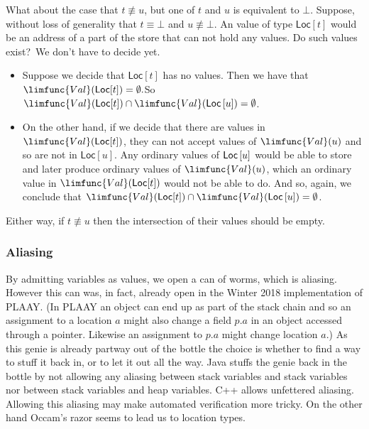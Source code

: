 \documentclass[12pt]{article}
\begin{document}
What about the case that $t\not\equiv u$, but one of $t$ and $u$ is
equivalent to $\bot $. Suppose, without loss of generality that $t\equiv
\bot $ and $u\not\equiv \bot $. An value of type $\mathsf{Loc}[t]$ would be
an address of a part of the store that can not hold any values. Do such
values exist?\ We don't have to decide yet.

\begin{itemize}
\item Suppose we decide that $\mathsf{Loc}[t]$ has no values. Then we have
that $\limfunc{Val}(\mathsf{Loc}[t])=\emptyset .$So $\limfunc{Val}(\mathsf{%
Loc}[t])\cap \limfunc{Val}(\mathsf{Loc}\left[ u\right] )=\emptyset $.

\item On the other hand, if we decide that there are values in $\limfunc{Val}%
(\mathsf{Loc}[t])$, they can not accept values of $\limfunc{Val}(u)$ and so
are not in $\mathsf{Loc}\left[ u\right] $. Any ordinary values of $\mathsf{%
Loc}\left[ u\right] $ would be able to store and later produce ordinary
values of $\limfunc{Val}(u)$, which an ordinary value in $\limfunc{Val}(%
\mathsf{Loc}[t])$ would not be able to do. And so, again, we conclude that $%
\limfunc{Val}(\mathsf{Loc}[t])\cap \limfunc{Val}(\mathsf{Loc}\left[ u\right]
)=\emptyset $.
\end{itemize}

Either way, if $t\not\equiv u$ then the intersection of their values should
be empty.

\subsubsection{Aliasing}

By admitting variables as values, we open a can of worms, which is aliasing.
However this can was, in fact, already open in the Winter 2018
implementation of PLAAY. (In PLAAY an object can end up as part of the stack
chain and so an assignment to a location $a$ might also change a field $p.a$
in an object accessed through a pointer. Likewise an assignment to $p.a$
might change location $a$.) As this genie is already partway out of the
bottle the choice is whether to find a way to stuff it back in, or to let it
out all the way. Java stuffs the genie back in the bottle by not allowing
any aliasing between stack variables and stack variables nor between stack
variables and heap variables. C++ allows unfettered aliasing. Allowing this
aliasing may make automated verification more tricky. On the other hand
Occam's razor seems to lead us to location types.
\end{document}
